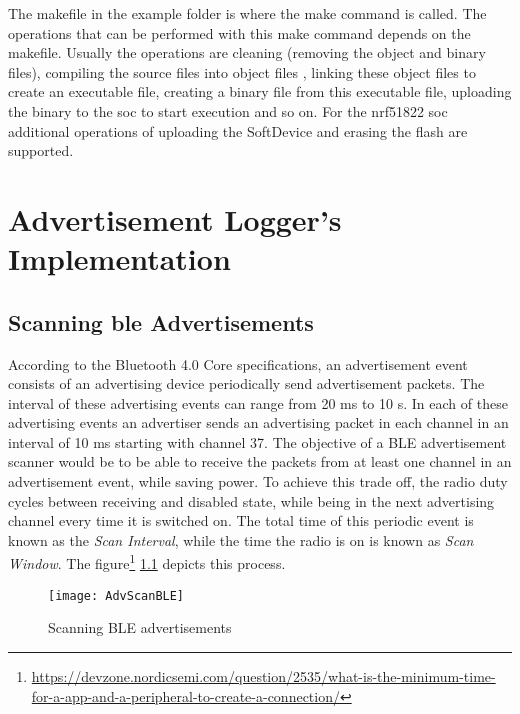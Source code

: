 The makefile in the example folder is where the make command is called. The operations that can be performed with this make command depends on the makefile. Usually the operations are cleaning (removing the object and binary files), compiling the source files into object files , linking these object files to create an executable file, creating a binary file from this executable file, uploading the binary to the \gls{soc} to start execution and so on. For the nrf51822 \gls{soc} additional operations of uploading the SoftDevice and erasing the flash are supported.



\chapter{Advertisement Logger's Implementation} \label{ApdxAdvLog}

\section{Scanning \gls{ble} Advertisements}

According to the Bluetooth 4.0 Core specifications, an advertisement event consists of an advertising device periodically send advertisement packets. The interval of these advertising events can range from 20 ms to 10 s. In each of these advertising events an advertiser sends an advertising packet in each channel in an interval of 10 ms starting with channel 37. The objective of a BLE advertisement scanner would be to be able to receive the packets from at least one channel in an advertisement event, while saving power. To achieve this trade off, the radio duty cycles between receiving and disabled state, while being in the next advertising channel every time it is switched on. The total time of this periodic event is known as the \emph{Scan Interval}, while the time the radio is on is known as \emph{Scan Window}. The figure\footnote{\href{https://devzone.nordicsemi.com/question/2535/what-is-the-minimum-time-for-a-app-and-a-peripheral-to-create-a-connection/}{https://devzone.nordicsemi.com/question/2535/what-is-the-minimum-time-for-a-app-and-a-peripheral-to-create-a-connection/}} \ref{fig:AdvScanBLE} depicts this process.

\begin{figure}[h]
\centering
\texttt{[image: AdvScanBLE]}
\caption{Scanning BLE advertisements}
\label{fig:AdvScanBLE}
\end{figure}

